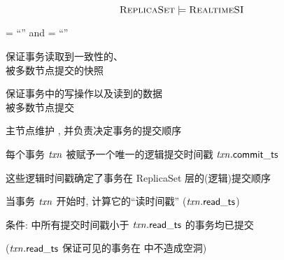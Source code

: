 
\begin{frame}{}

  \[
	\textsc{ReplicaSet} \models \textsc{RealtimeSI}
  \]
\end{frame}

\begin{frame}{}
  \begin{center}
	\rc = ``\snapshotrc'' and \wc = ``\majority''
  \end{center}

  \vspace{0.30cm}
  \begin{description}
	\setlength{\itemsep}{10pt}
	\item[\rc = ``\snapshotrc'':] 保证事务读取到一致性的、\\[5pt] 被多数节点提交的快照
	\item[\wc = ``\majority'':] 保证事务中的写操作以及读到的数据 \\[5pt]
	  被多数节点提交
  \end{description}
\end{frame}

\begin{frame}{}
  \begin{center}
	主节点维护 \oplog, 并负责决定事务的提交顺序

	\vspace{0.50cm}

	\pause
	\vspace{0.50cm}
	每个事务 $\mathit{txn}$ 被赋予一个唯一的逻辑提交时间戳 $\mathit{txn}.{\sf commit\_ts}$

	\vspace{0.50cm}
	这些逻辑时间戳确定了事务在 ReplicaSet 层的(逻辑)提交顺序
  \end{center}
\end{frame}

\begin{frame}{}
  \begin{center}
	当事务 $\mathit{txn}$ 开始时, 计算它的``读时间戳'' ($\mathit{txn}.{\sf read\_ts}$)

	\vspace{0.50cm}

	\vspace{0.50cm}
	条件: \oplog{} 中所有提交时间戳小于 $\mathit{txn}.{\sf read\_ts}$ 的事务均已提交

	\vspace{0.30cm}
	($\mathit{txn}.{\sf read\_ts}$ 保证可见的事务在 \oplog{} 中不造成空洞)
  \end{center}
\end{frame}

